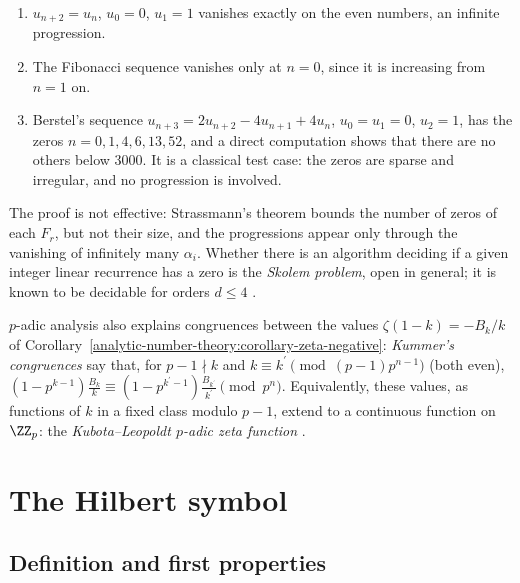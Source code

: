 \begin{example}\label{p-adic-numbers:example-skolem}
\begin{enumerate}
\item $u_{n+2} = u_n$, $u_0 = 0$, $u_1 = 1$ vanishes exactly on the even numbers, an infinite progression.
\item The Fibonacci sequence vanishes only at $n = 0$, since it is increasing from $n = 1$ on.
\item Berstel's sequence $u_{n+3} = 2u_{n+2} - 4u_{n+1} + 4u_n$, $u_0 = u_1 = 0$, $u_2 = 1$, has the zeros $n = 0, 1, 4, 6, 13, 52$, and a direct computation shows that there are no others below $3000$.
It is a classical test case: the zeros are sparse and irregular, and no progression is involved.
\end{enumerate}
\end{example}

\begin{remark}\label{p-adic-numbers:remark-skolem-problem}
The proof is not effective: Strassmann's theorem bounds the number of zeros of each $F_r$, but not their size, and the progressions appear only through the vanishing of infinitely many $\alpha_i$. Whether
there is an algorithm deciding if a given integer linear recurrence has a zero is the \emph{Skolem problem}, open in general; it is known to be decidable for orders $d \leq 4$ \cite{everest-recurrence}.
\end{remark}

\begin{remark}\label{p-adic-numbers:remark-kummer}
$p$-adic analysis also explains congruences between the values $\zeta(1 - k) = -B_k/k$ of Corollary~\ref{analytic-number-theory:corollary-zeta-negative}: \emph{Kummer's congruences} say that, for
$p - 1 \nmid k$ and $k \equiv k^{\prime} \pmod{(p - 1)p^{n-1}}$ (both even), $(1 - p^{k-1})\frac{B_k}{k} \equiv (1 - p^{k^{\prime}-1})\frac{B_{k^{\prime}}}{k^{\prime}} \pmod{p^n}$. Equivalently, these values, as functions of
$k$ in a fixed class modulo $p - 1$, extend to a continuous function on $\ZZ_p$: the \emph{Kubota--Leopoldt $p$-adic zeta function} \cite[Chapter II]{koblitz-padic}.
\end{remark}

\section{The Hilbert symbol}\label{p-adic-numbers:section-hilbert-symbol}

\subsection{Definition and first properties}\label{p-adic-numbers:subsection-hilbert-definition}

